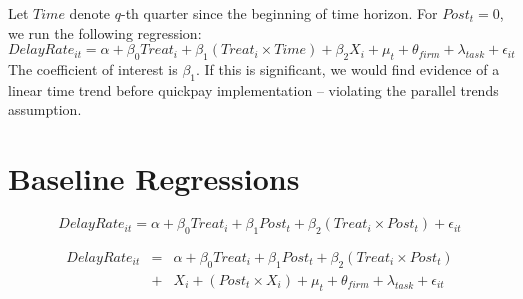 \documentclass[
]{article}
\begin{document}
Let \(Time\) denote \(q\)-th quarter since the beginning of time
horizon. For \(Post_t =0\), we run the following regression:
\[ DelayRate_{it} = \alpha+\beta_0 Treat_i + \beta_1 (Treat_i \times Time) + \beta_2 X_i + \mu_t + \theta_{firm} + \lambda_{task} +\epsilon_{it}\]
The coefficient of interest is \(\beta_1\). If this is significant, we
would find evidence of a linear time trend before quickpay
implementation -- violating the parallel trends assumption.

\hypertarget{baseline-regressions}{%
\section{Baseline Regressions}\label{baseline-regressions}}

\[ DelayRate_{it} = \alpha+\beta_0 Treat_i + \beta_1 Post_t + \beta_2 (Treat_i \times Post_t) + \epsilon_{it}\]

\[ \begin{aligned} DelayRate_{it} &=& \alpha+\beta_0 Treat_i + \beta_1 Post_t + \beta_2 (Treat_i \times Post_t)\\
&+&  X_i + (Post_t \times X_i) + \mu_t + \theta_{firm} + \lambda_{task}+ \epsilon_{it}
\end{aligned}\]
\end{document}
